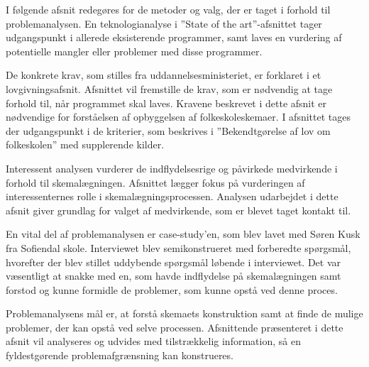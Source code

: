 I følgende afsnit redegøres for de metoder og valg, der er taget i forhold til problemanalysen. En teknologianalyse i ”State of the art”-afsnittet tager udgangspunkt i allerede eksisterende programmer, samt laves en vurdering af potentielle mangler eller problemer med disse programmer.

De konkrete krav, som stilles fra uddannelsesministeriet, er forklaret i et lovgivningsafsnit. Afsnittet vil fremstille de krav, som er nødvendig at tage forhold til, når programmet skal laves. Kravene beskrevet i dette afsnit er nødvendige for forståelsen af opbyggelsen af folkeskoleskemaer. I afsnittet tages der udgangspunkt i de kriterier, som beskrives i ”Bekendtgørelse af lov om folkeskolen” med supplerende kilder.

Interessent analysen vurderer de indflydelsesrige og påvirkede medvirkende i forhold til skemalægningen. Afsnittet lægger fokus på vurderingen af interessenternes rolle i skemalægningsprocessen. Analysen udarbejdet i dette afsnit giver grundlag for valget af medvirkende, som er blevet taget kontakt til.

En vital del af problemanalysen er case-study’en, som blev lavet med Søren Kusk fra Sofiendal skole. Interviewet blev semikonstrueret med forberedte spørgsmål, hvorefter der blev stillet uddybende spørgsmål løbende i interviewet. Det var væsentligt at snakke med en, som havde indflydelse på skemalægningen samt forstod og kunne formidle de problemer, som kunne opstå ved denne proces.

Problemanalysens mål er, at forstå skemaets konstruktion samt at finde de mulige problemer, der kan opstå ved selve processen. Afsnittende præsenteret i dette afsnit vil analyseres og udvides med tilstrækkelig information, så en fyldestgørende problemafgrænsning kan konstrueres. 
